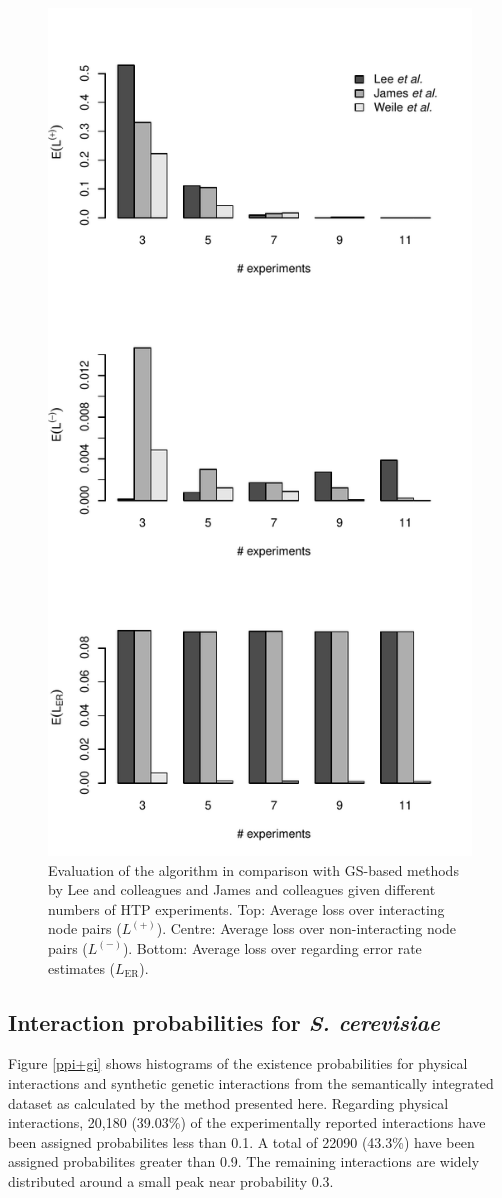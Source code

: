 \documentclass{bioinfo}
\newcommand{\species}[1]{\textit{#1}}
\begin{document}
\begin{figure}[!tpb]
\centerline{\includegraphics[width=.5\textwidth]{fig1.pdf}}
\caption{Evaluation of the algorithm in comparison with GS-based methods by Lee and colleagues and James and colleagues given different numbers of HTP experiments. Top: Average loss over interacting node pairs ($L^{(+)}$). Centre: Average loss over non-interacting node pairs ($L^{(-)}$). Bottom: Average loss over regarding error rate estimates ($L_\text{ER}$).}
\label{htp}
\end{figure}


\subsection{Interaction probabilities for \species{S. cerevisiae}}

Figure \ref{ppi+gi} shows histograms of the existence probabilities for physical interactions and synthetic genetic interactions from the semantically integrated dataset as calculated by the method presented here. Regarding physical interactions, 20,180 (39.03\%) of the experimentally reported interactions have been assigned probabilites less than 0.1. A total of 22090 (43.3\%) have been assigned probabilites greater than 0.9. The remaining interactions are widely distributed around a small peak near probability 0.3.
\end{document}
